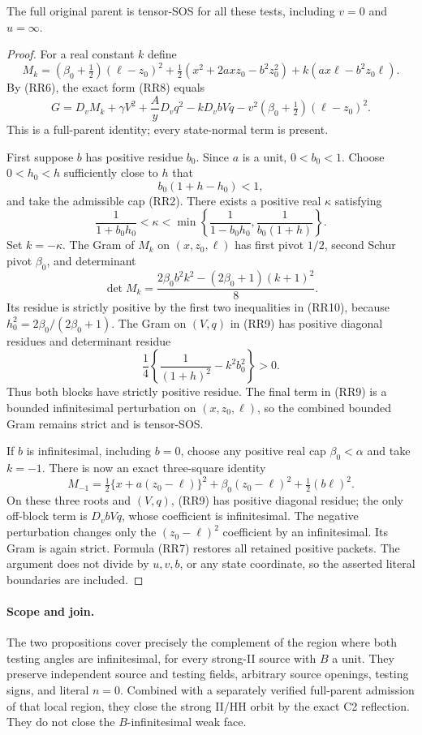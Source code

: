 \begin{proposition}
The full original parent is tensor-SOS for all these tests, including
$v=0$ and $u=\infty$.
\end{proposition}
\begin{proof}
For a real constant $k$ define
\[
 M_k=(\beta_0+\tfrac12)(\ell-z_0)^2
 +\tfrac12(x^2+2axz_0-b^2z_0^2)
 +k(ax\ell-b^2z_0\ell).
\]
By (RR6), the exact form (RR8) equals
\[
 \boxed{G=D_vM_k+
 \gamma V^2+\frac AyD_vq^2-kD_vbVq
 -v^2(\beta_0+\tfrac12)(\ell-z_0)^2.}                   \tag{RR9}
\]
This is a full-parent identity; every state-normal term is present.

First suppose $b$ has positive residue $b_0$.  Since $a$ is a unit,
$0<b_0<1$.  Choose $0<h_0<h$ sufficiently close to $h$ that
\[
 b_0(1+h-h_0)<1,
\]
and take the admissible cap (RR2).  There exists a positive real
$\kappa$ satisfying
\[
 \frac1{1+b_0h_0}<\kappa<
 \min\left\{\frac1{1-b_0h_0},\frac1{b_0(1+h)}\right\}.
                                                               \tag{RR10}
\]
Set $k=-\kappa$.  The Gram of $M_k$ on $(x,z_0,\ell)$ has
first pivot $1/2$, second Schur pivot $\beta_0$, and determinant
\[
 \det M_k=\frac{2\beta_0 b^2k^2-(2\beta_0+1)(k+1)^2}{8}.
                                                               \tag{RR11}
\]
Its residue is strictly positive by the first two inequalities in
(RR10), because $h_0^2=2\beta_0/(2\beta_0+1)$.  The Gram on $(V,q)$
in (RR9) has positive diagonal residues and determinant residue
\[
 \frac14\left\{\frac1{(1+h)^2}-k^2b_0^2\right\}>0.       \tag{RR12}
\]
Thus both blocks have strictly positive residue.  The final term in
(RR9) is a bounded infinitesimal perturbation on $(x,z_0,\ell)$,
so the combined bounded Gram remains strict and is tensor-SOS.

If $b$ is infinitesimal, including $b=0$, choose any positive real
cap $\beta_0<\alpha$ and take $k=-1$.  There is now an exact
three-square identity
\[
 M_{-1}=\tfrac12\{x+a(z_0-\ell)\}^2
       +\beta_0(z_0-\ell)^2+\tfrac12(b\ell)^2.           \tag{RR13}
\]
On these three roots and $(V,q)$, (RR9) has positive diagonal
residue; the only off-block term is $D_vbVq$, whose coefficient
is infinitesimal.  The negative perturbation changes only the
$(z_0-\ell)^2$ coefficient by an infinitesimal.  Its Gram is again
strict.  Formula (RR7) restores all retained positive packets.
The argument does not divide by $u,v,b$, or any state coordinate,
so the asserted literal boundaries are included.
\end{proof}

\paragraph{Scope and join.}
The two propositions cover precisely the complement of the region
where both testing angles are infinitesimal, for every strong-II
source with $B$ a unit.  They preserve independent source and testing
fields, arbitrary source openings, testing signs, and literal $n=0$.
Combined with a separately verified full-parent admission of that
local region, they close the strong II/HH orbit by the exact C2
reflection.  They do not close the $B$-infinitesimal weak face.
